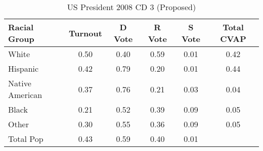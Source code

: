 \begin{table}[htb]
\begin{center}
\caption{US President 2008 CD 3 (Proposed)}
\label{pres08_cvap_cd_3}
\begin{tabular}{lccccc}
  \hline
Racial Group & Turnout & D Vote & R Vote & S Vote & Total CVAP \\ 
  \hline
White & 0.50 & 0.40 & 0.59 & 0.01 & 0.42 \\ 
  Hispanic & 0.42 & 0.79 & 0.20 & 0.01 & 0.44 \\ 
  Native American & 0.37 & 0.76 & 0.21 & 0.03 & 0.04 \\ 
  Black & 0.21 & 0.52 & 0.39 & 0.09 & 0.05 \\ 
  Other & 0.30 & 0.55 & 0.36 & 0.09 & 0.05 \\ 
  Total Pop & 0.43 & 0.59 & 0.40 & 0.01 &  \\ 
   \hline
\end{tabular}
\end{center}
\end{table}
